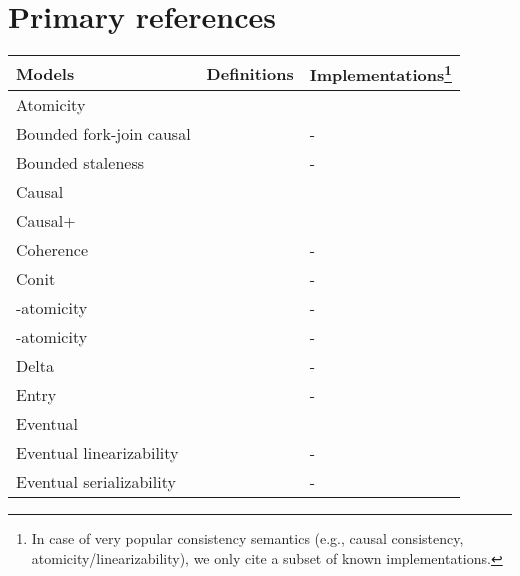 \documentclass[letter, 11pt]{article}
\renewcommand{\cite}{\citep}
\begin{document}
 
\clearpage
\section{Primary references}
\label{sec:reftable}
\renewcommand{\arraystretch}{1.11}
\begin{center}
	\begin{longtabu}to \textwidth {
                        X[1,l]|
                        X[1.5,l]|
                        X[1.5,l]}
	\hline
		Models           & Definitions              & Implementations\footnote{In case of very popular consistency semantics (e.g., causal consistency, atomicity/linearizability), we only cite a subset of known implementations.} \\
	\hline

		Atomicity       & \cite{Lamport:86:vol2}                & \cite{Attiya.ea:95} \\
		Bounded fork-join causal         & \cite{P-Mahajan.Dahlin:11}                & - \\
		Bounded staleness         & \cite{Mahajan.Setty.ea:10}                & - \\
		Causal         & \cite{Lamport:78,Hutto.Ahamad:90,Ahamad.Neiger.ea:95,P-Mahajan.Dahlin:11}                & \cite{Ladin.ea:92,Birman.ea:91,Lakshmanan.ea:01,Lloyd.Freedma:13,Du.ea:14,Zawirski.ea:15,Lesani.Bell.ea:16} \\ 		Causal+         & \cite{Lloyd.Freedman.ea:11}                & \cite{Petersen.ea:97,Belaramani.ea:06,Almeida.Leitao.ea:13} \\
		Coherence         & \cite{Dubois.Scheurich.ea:86}                & - \\
		Conit         & \cite{Yu.Vahdat:02}                & - \\
				-atomicity         & \cite{Golab.ea:14}     & - \\ 
		-atomicity         & \cite{Golab.Li.ea:11}                & - \\
		Delta         & \cite{Singla.ea:97}                & - \\
		Entry         & \cite{Bershad.Zekauskas:91}                & - \\
		Eventual        & \cite{Terry.Demers.ea:94,Vogels:08}     & \cite{Reiher.ea:94,DeCandia.Hastorun.ea:07,Singh.ea:09,Bortnikov.Chockler.ea:10,Bronson.ea:13} \\ 		Eventual linearizability         & \cite{Serafini.Dobre.ea:10}                & - \\
		Eventual serializability         & \cite{Fekete.Gupta.ea:96}                & - \\

\end{longtabu}
\end{center}
\end{document}

